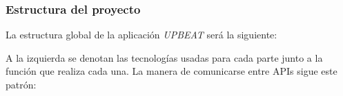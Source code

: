 \documentclass{article}
\begin{document}
\subsubsection{Estructura del proyecto}
La estructura global de la aplicación \textit{UPBEAT} será la siguiente:
\begin{figure}[H]
	\hspace*{-1.5cm}
\end{figure}
A la izquierda se denotan las tecnologías usadas para cada parte junto a la función que realiza cada una.
\newpage
La manera de comunicarse entre APIs sigue este patrón:
\begin{figure}[H]
\end{figure}
\end{document}
